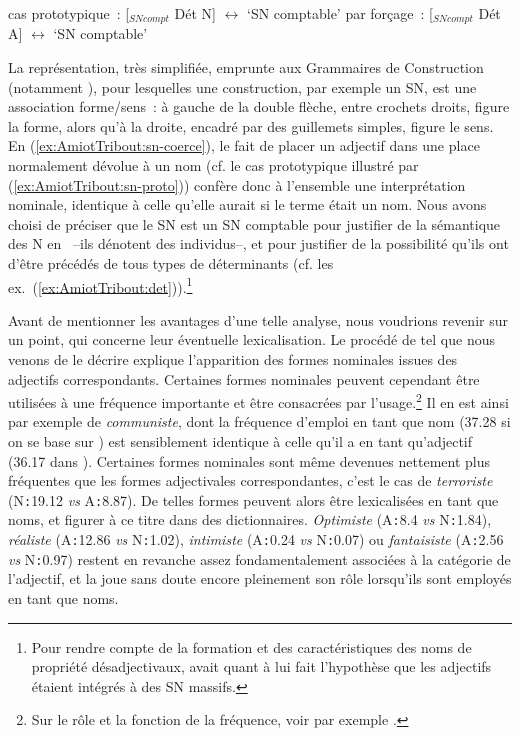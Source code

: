 \documentclass[output=paper]{LSP/langsci}
\begin{document}
\begin{exe}
\ex
\begin{xlist}
\ex \label{ex:AmiotTribout:sn-proto} cas prototypique~: [$_{SNcompt}$ Dét N]  $\longleftrightarrow$ `SN comptable'
\ex \label{ex:AmiotTribout:sn-coerce}   par forçage~: [$_{SNcompt}$ Dét A]  $\longleftrightarrow$ `SN comptable'
\end{xlist}
\end{exe}

\clearpage 
La représentation, très simplifiée, emprunte aux Grammaires de Construction (notamment \citep{Booij10}), pour lesquelles une construction, par exemple un SN, est une association forme/sens~: à gauche de la double flèche, entre crochets droits, figure la forme, alors qu'à la droite, encadré par des guillemets simples, figure le sens. En (\ref{ex:AmiotTribout:sn-coerce}), le fait de placer un adjectif dans une place normalement dévolue à un nom (cf. le cas prototypique illustré par (\ref{ex:AmiotTribout:sn-proto})) confère donc à l'ensemble une interprétation nominale, identique à celle qu'elle aurait si le terme était un nom.  Nous avons choisi de préciser que le SN est un SN comptable pour justifier de la sémantique des N en \iste\ --ils dénotent des individus--, et pour justifier de la possibilité qu'ils ont d'être précédés de tous types de déterminants (cf. les ex.~(\ref{ex:AmiotTribout:det})).\footnote{Pour rendre compte de la formation et des caractéristiques des noms de propriété désadjectivaux, \cite{lauwers14b} avait quant à lui fait l'hypothèse que les adjectifs étaient intégrés à des SN massifs.}

Avant de mentionner les avantages d'une telle analyse, nous voudrions revenir sur un point, qui concerne leur éventuelle lexicalisation. Le procédé de  tel que nous venons de le décrire explique l'apparition des formes nominales issues des adjectifs correspondants. Certaines formes nominales peuvent cependant être utilisées à une fréquence importante et être consacrées par l'usage.\footnote{Sur le rôle et la fonction de la fréquence, voir par exemple \cite{bybee06, bybeethompson97, ellis02, gries13}.} Il en est ainsi par exemple de \textit{communiste}, dont la fréquence d'emploi en tant que nom  (37.28 si on se base sur \lexiq) est sensiblement identique à celle qu'il a en tant  qu'adjectif (36.17 dans \lexiq). Certaines formes nominales sont même devenues nettement plus fréquentes que les formes adjectivales correspondantes, c'est le cas de \textit{terroriste} (N\verb!:!19.12 \textit{vs} A\verb!:!8.87). De telles formes peuvent alors être lexicalisées en tant que noms, et figurer à ce titre dans des dictionnaires. \textit{Optimiste} (A\verb!:!8.4 \textit{vs} N\verb!:!1.84), \textit{réaliste} (A\verb!:!12.86 \textit{vs}  N\verb!:!1.02), \textit{intimiste}  (A\verb!:!0.24 \textit{vs} N\verb!:!0.07) ou \textit{fantaisiste} (A\verb!:!2.56 \textit{vs} N\verb!:!0.97) restent en revanche assez fondamentalement associées à la catégorie de l'adjectif, et la  joue sans doute encore pleinement son rôle lorsqu'ils sont employés en tant que noms.
\end{document}
